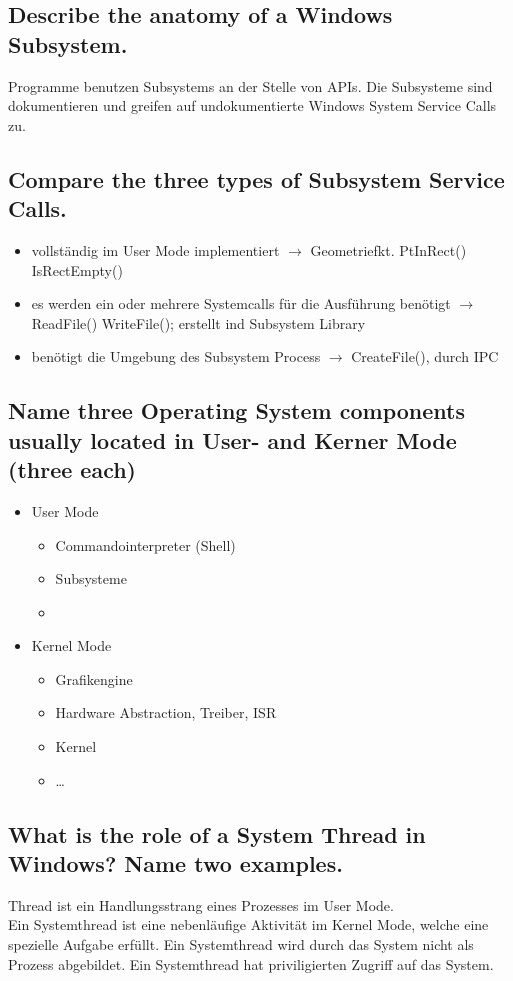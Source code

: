 \subsection{Describe the anatomy of a Windows Subsystem.}
Programme benutzen Subsystems an der Stelle von APIs. Die Subsysteme sind dokumentieren und greifen auf undokumentierte Windows System Service Calls zu.

\subsection{Compare the three types of Subsystem Service Calls.}
\begin{itemize}
	\setlength\itemsep{-0.5em}
	\item vollst\"andig im User Mode implementiert $\rightarrow$ Geometriefkt. PtInRect() IsRectEmpty()
	\item es werden ein oder mehrere Systemcalls f\"ur die Ausf\"uhrung ben\"otigt $\rightarrow$ ReadFile() WriteFile(); erstellt ind Subsystem Library
	\item ben\"otigt die Umgebung des Subsystem Process $\rightarrow$ CreateFile(), durch IPC 
\end{itemize}

\subsection{Name three Operating System components usually located in User- and Kerner Mode (three each)}
\begin{itemize}
	\setlength\itemsep{-0.5em}
	\item User Mode
	\begin{itemize}
		\item Commandointerpreter (Shell)
		\item Subsysteme
		\item \missing
	\end{itemize}
	\item Kernel Mode
	\begin{itemize}
		\item Grafikengine
		\item Hardware Abstraction, Treiber, ISR
		\item Kernel
		\item \dots
	\end{itemize}
\end{itemize}

\subsection{What is the role of a System Thread in Windows? Name two examples.}
Thread ist ein Handlungsstrang eines Prozesses im User Mode. \\
Ein Systemthread ist eine nebenläufige Aktivität im Kernel Mode, welche eine spezielle Aufgabe erfüllt.
Ein Systemthread wird durch das System nicht als Prozess abgebildet.
Ein Systemthread hat priviligierten Zugriff auf das System.

